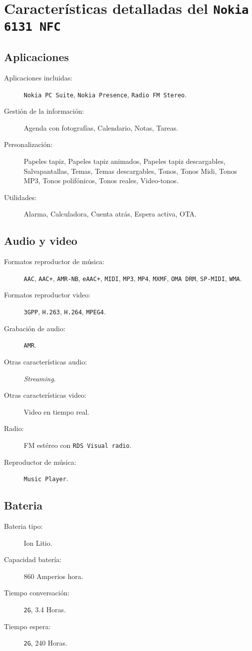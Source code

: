 \chapter{Características detalladas del \texttt{Nokia 6131 \acs{NFC}}}
\label{chap:nokia}
\section{Aplicaciones}
\begin{description}
\item[Aplicaciones incluidas:] \texttt{Nokia PC Suite}, \texttt{Nokia
Presence}, \texttt{Radio FM Stereo}.
\item[Gestión de la información:] Agenda con fotografías, Calendario, Notas, 
Tareas.
\item[Personalización:] Papeles tapiz, Papeles tapiz animados, Papeles tapiz 
descargables, Salvapantallas, Temas, Temas descargables, Tonos, Tonos Midi,
Tonos MP3, Tonos polifónicos, Tonos reales, Video-tonos.
\item[Utilidades:] Alarma, Calculadora, Cuenta atrás, Espera activa, \acs{OTA}.
\end{description}
\section{Audio y video}
\begin{description}
\item[Formatos reproductor de música:] \texttt{AAC}, \texttt{AAC+},
\texttt{AMR-NB}, \texttt{eAAC+}, \texttt{MIDI}, \texttt{MP3}, \texttt{MP4}, 
\texttt{MXMF}, \texttt{OMA DRM}, \texttt{SP-MIDI}, \texttt{WMA}.
\item[Formatos reproductor video:] \texttt{3GPP}, \texttt{H.263},
\texttt{H.264}, \texttt{MPEG4}.
\item[Grabación de audio:] \texttt{AMR}.
\item[Otras características audio:] \emph{Streaming}.
\item[Otras características video:] Video en tiempo real.
\item[Radio:] FM estéreo con \texttt{RDS Visual radio}.
\item[Reproductor de música:] \texttt{Music Player}.
\end{description}
\section{Bateria}
\begin{description}
\item[Bateria tipo:] Ion Litio.
\item[Capacidad batería:] 860 Amperios hora.
\item[Tiempo conversación:] \texttt{2G}, 3.4 Horas.
\item[Tiempo espera:] \texttt{2G}, 240 Horas.
\end{description}
